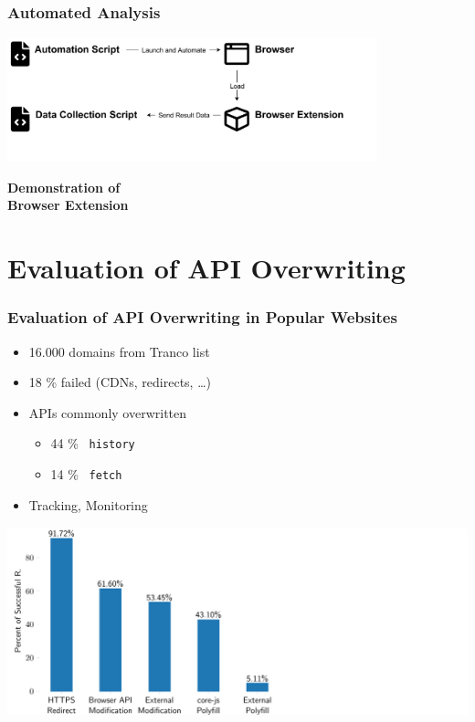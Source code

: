 \documentclass[t,aspectratio=169]{beamer}
\begin{document}
\begin{frame}
	\frametitle{Automated Analysis}
	\vfill
	\begin{center}
		\includegraphics[height=3.6cm]{img/automation-notext.pdf}
	\end{center}
	\vfill
\end{frame}

\begin{frame}[plain]
	\centering
	\vspace*{\fill}
	\textbf{Demonstration of\\ Browser Extension}
	\vspace*{\fill}
\end{frame}

\section{Evaluation of API Overwriting}

\begin{frame}
	\frametitle{Evaluation of API Overwriting in Popular Websites}
	\begin{itemize}
		\item 16.000 domains from Tranco list
		\item 18 \% failed (CDNs, redirects, …)
		\item APIs commonly overwritten
		\begin{itemize}
			\item 44 \% ~\texttt{history}
			\item 14 \% ~\texttt{fetch}
		\end{itemize}
		\item Tracking, Monitoring
	\end{itemize}
	\raggedleft
	\par\vspace{-3cm}
	\includegraphics[height=5.5cm]{img/evaluation-overview-bars.pdf}
\end{frame}
\end{document}
